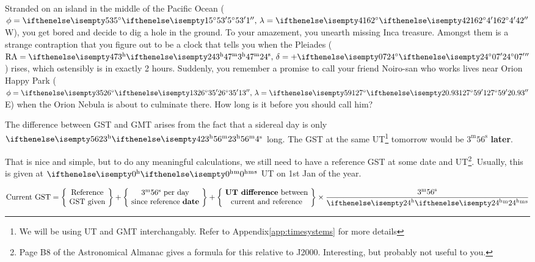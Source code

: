 \documentclass{article}
\begin{document}
\begin{Exercise}
Stranded on an island in the middle of the Pacific Ocean ($\phi=\sexg{5}{53}{1},\,\lambda=\sexg{162}{4}{42}$W), you get bored and decide to dig a hole in the ground. To your amazement, you unearth missing Inca treasure. Amongst them is a strange contraption that you figure out to be a clock that tells you when the Pleiades ($\RA=\hms{3}{47}{24},\,\delta=+\sexg{24}{07}{}$) rises, which ostensibly is in exactly 2 hours. Suddenly, you remember a promise to call your friend Noiro-san who works lives near Orion Happy Park ($\phi=\sexg{26}{35}{13},\,\lambda=\sexg{127}{59}{20.93}$E) when the Orion Nebula is about to culminate there. How long is it before you should call him?
\end{Exercise}
\begin{Answer}
\end{Answer}
\medskip

The difference between GST and GMT arises from the fact that a sidereal day is only $\hms{23}{56}{4}$ long. The GST at the same UT\footnote{We will be using UT and GMT interchangably. Refer to Appendix\;\ref{app:timesystems} for more details} tomorrow would be $3^\mathrm{m}56^\mathrm{s}$ \textbf{later}.

That is nice and simple, but to do any meaningful calculations, we still need to have a reference GST at some date and UT\footnote{Page B8 of the Astronomical Almanac gives a formula for this relative to J2000. Interesting, but probably not useful to you.}. Usually, this is given at $\hms{0}{}{}$ UT on 1st Jan of the year.

\begin{equation}
    \text{Current GST} = \left\{\ 
    \begin{matrix} 
        \text{Reference} \\ 
        \text{GST given}
    \end{matrix}
    \ \right\}
    + \left\{\ 
    \begin{matrix} 
        3^\mathrm{m}56^\mathrm{s} \text{ per day}\\
        \text{since reference \textbf{date}}
    \end{matrix}
    \ \right\}
    + \left\{\ 
    \begin{matrix} 
        \text{\textbf{UT difference} between} \\
        \text{current and reference}
    \end{matrix}
    \ \right\}
    \times \frac{3^\mathrm{m}56^\mathrm{s}}{\hms{24}{}{}}
\end{equation}
\end{document}
